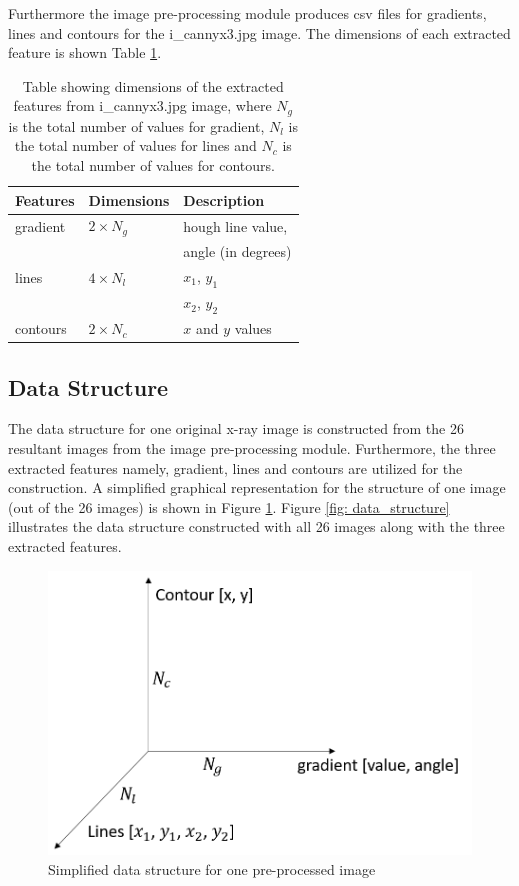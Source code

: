 \documentclass[11pt,twocolumn]{witseiepaper}
\begin{document}
	Furthermore the image pre-processing module produces csv files for gradients, lines and contours for the i\_cannyx3.jpg image. The dimensions of each extracted feature is shown Table \ref{feature_selection}.
	\begin{table}[!h]
		\centering
		\caption{Table showing dimensions of the extracted features from i\_cannyx3.jpg image, where $N_g$ is the total number of values for gradient, $N_l$ is the total number of values for lines and $N_c$ is the total number of values for contours.}
		\label{feature_selection}
		\begin{tabular}{|l|p{2cm}|l|}
			\hline
			Features & Dimensions & Description \\
			\hline \hline
			gradient & $2 \times N_g $ & hough line value, \\
			& & angle (in degrees)\\
			\hline
			lines    & $4 \times N_l $ & $x_{1}$, $y_{1}$ \\
			& & $x_{2}$, $y_{2}$ \\
			\hline
			contours & $2 \times N_c $  & $x$ and $y$ values \\
			\hline
		\end{tabular}
	\end{table}
	
	\subsection{Data Structure}
	The data structure for one original x-ray image is constructed from the 26 resultant images from the image pre-processing module. Furthermore, the three extracted features namely, gradient, lines and contours are utilized for the construction. A simplified graphical representation for the structure of one image (out of the 26 images) is shown in Figure \ref{fig: second_structure}. Figure \ref{fig: data_structure} illustrates the data structure constructed with all 26 images along with the three extracted features.
	\begin{figure}[!h]
		\centering
		\includegraphics[scale=0.23]{second_structure.png}
		\caption{Simplified data structure for one pre-processed image}
		\label{fig: second_structure}
	\end{figure}
\end{document}
